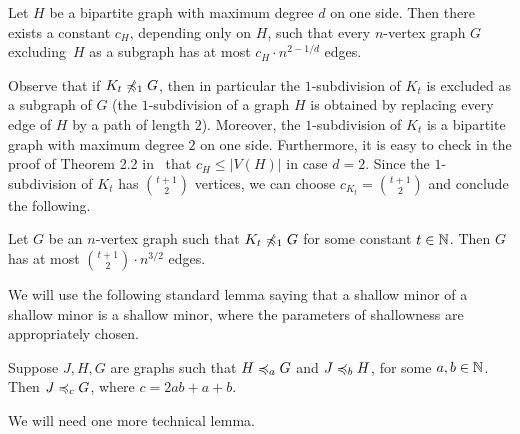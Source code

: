 \begin{lemma}\label{lem:densitynd}
Let $H$ be a bipartite graph with maximum degree
$d$ on one side. Then there exists a constant $c_H$, depending 
only on $H$, such that every $n$-vertex graph $G$
excluding~$H$ as a subgraph has at most $c_H\cdot n^{2-1/d}$
edges. 
\end{lemma} 

Observe that if $K_t\not\preccurlyeq_1G$, then in particular
the $1$-subdivision of $K_t$ is excluded as a subgraph
of $G$ (the $1$-subdivision of a graph $H$ is obtained by 
replacing every edge of $H$ by a path of length $2$). 
Moreover, the $1$-subdivision of 
$K_t$ is a bipartite graph with maximum degree $2$ on one
side. Furthermore, it is easy to check in the 
proof of Theorem 2.2 in~\cite{alon2003turan} 
that $c_H\leq |V(H)|$
in case $d=2$. Since the $1$-subdivision of $K_t$ has 
$\binom{t+1}{2}$ vertices, we can choose $c_{K_t}=\binom{t+1}{2}$ and
conclude the following.   

\begin{corollary}\label{crl:densitynd}
Let $G$ be an $n$-vertex graph such that $K_t\not\preccurlyeq_1 G$ for
some constant $t\in \mathbb{N}$. Then $G$ has at most
$\binom{t+1}{2}\cdot n^{3/2}$ edges.
\end{corollary}

We will use the following standard lemma saying that a shallow minor of a shallow minor is a shallow minor, where the parameters of shallowness are appropriately chosen.

\begin{lemma}\label{lem:combineminors}
Suppose $J,H,G$ are graphs such that $H\preccurlyeq_a G$ and $J\preccurlyeq_b H$, for some $a,b\in \mathbb{N}$.
Then $J\preccurlyeq_c G$, where $c=2ab+a+b$.
\end{lemma}

We will need one more technical lemma.

